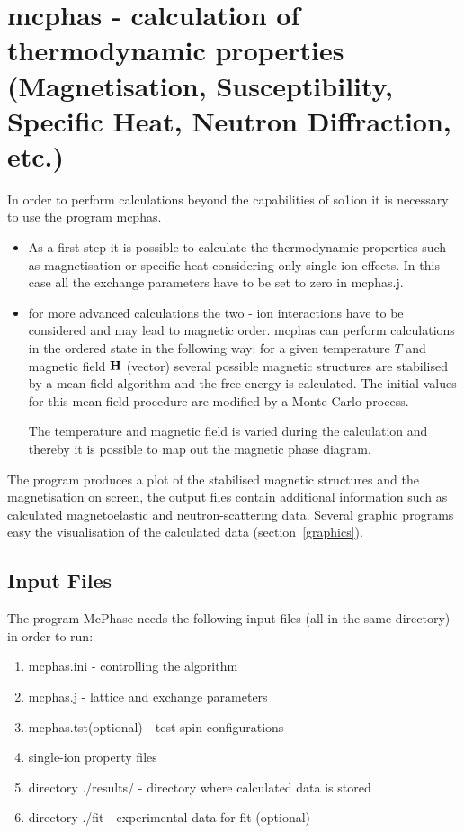 \section{{\prg mcphas} - calculation of thermodynamic properties (Magnetisation, Susceptibility, Specific Heat, Neutron %
Diffraction, etc.)}
\label{runmcphas}

In order to perform calculations beyond the capabilities of {\prg so1ion} it is necessary
to use the program {\prg mcphas}. 
\begin{itemize}
\item As a first step it is possible to
calculate the thermodynamic properties such as magnetisation or specific heat
considering only single ion effects. In this case all the exchange parameters
have to be set to zero in {\prg mcphas.j}. 
\item for more advanced calculations the two - ion interactions have to be
considered and may lead to magnetic order. {\prg mcphas} can perform 
calculations in the ordered state in the following way: for 
a given temperature $T$ and magnetic field $\mathbf H$ (vector)
several possible magnetic structures are stabilised
by a mean field algorithm and the free energy is 
calculated. The initial values for this mean-field procedure are
modified by a Monte Carlo process.


The temperature and magnetic field is varied during the calculation
and thereby it is possible to map out the magnetic phase diagram.
\end{itemize}

The program produces a plot of the stabilised magnetic
structures and the magnetisation on screen, the
output files contain additional information 
such as calculated magnetoelastic and  neutron-scattering
data. Several graphic programs easy the visualisation of the
calculated data (section~\ref{graphics}).



\subsection{Input Files}
The program {\prg McPhase} needs the following input files (all in the same directory)
 in order to run:

\begin{enumerate}
\item {\prg mcphas.ini}
 - controlling the algorithm
\item {\prg mcphas.j}
  - lattice and exchange parameters
\item {\prg mcphas.tst(optional)}  - test spin configurations
\item {\prg single-ion property files}
\item {\prg directory ./results/}
 - directory where calculated data is stored
\item {\prg directory ./fit} - experimental data for fit (optional)
\end{enumerate}


